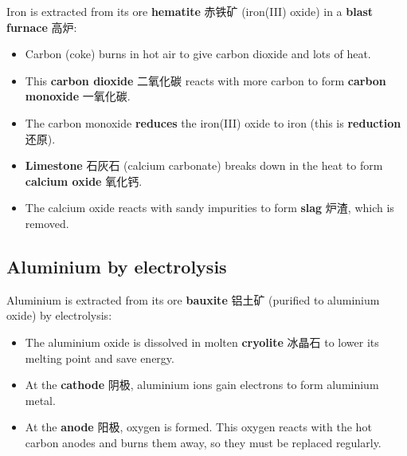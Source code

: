 \documentclass[11pt]{article}
\begin{document}
Iron is extracted from its ore \textbf{hematite} 赤铁矿 (iron(III) oxide) in a \textbf{blast furnace} 高炉:

\begin{itemize}
\item Carbon (coke) burns in hot air to give carbon dioxide and lots of heat.

\item This \textbf{carbon dioxide} 二氧化碳 reacts with more carbon to form \textbf{carbon monoxide} 一氧化碳.

\item The carbon monoxide \textbf{reduces} the iron(III) oxide to iron (this is \textbf{reduction} 还原).

\item \textbf{Limestone} 石灰石 (calcium carbonate) breaks down in the heat to form \textbf{calcium oxide} 氧化钙.

\item The calcium oxide reacts with sandy impurities to form \textbf{slag} 炉渣, which is removed.

\end{itemize}

\subsection*{Aluminium by electrolysis}

Aluminium is extracted from its ore \textbf{bauxite} 铝土矿 (purified to aluminium oxide) by electrolysis:

\begin{itemize}
\item The aluminium oxide is dissolved in molten \textbf{cryolite} 冰晶石 to lower its melting point and save energy.

\item At the \textbf{cathode} 阴极, aluminium ions gain electrons to form aluminium metal.

\item At the \textbf{anode} 阳极, oxygen is formed. This oxygen reacts with the hot carbon anodes and burns them away, so they must be replaced regularly.

\end{itemize}
\end{document}
